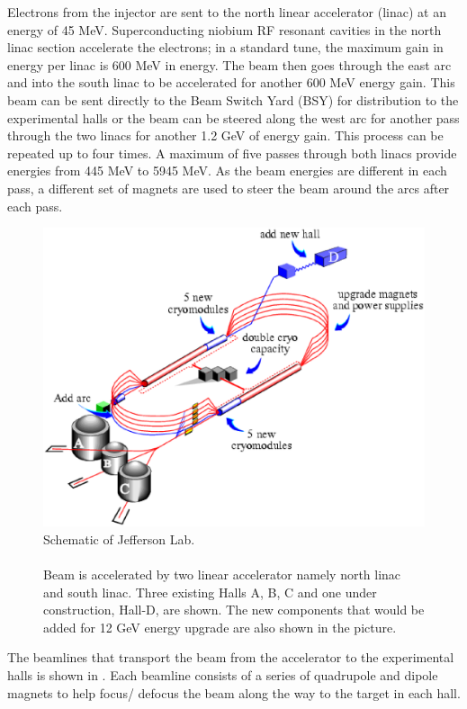 %
\label{LINAC}
Electrons from the injector are sent to the north linear accelerator (linac) at an energy of 45 MeV. Superconducting niobium RF resonant cavities in the north linac section accelerate the electrons; in a standard tune, the maximum gain in energy per linac is 600 MeV in energy. The beam then goes through the east arc and into the south linac to be accelerated for another 600 MeV energy gain. This beam can be sent directly to the Beam Switch Yard (BSY) for distribution to the experimental halls or the beam can be steered along the west arc for another pass through the two linacs for another 1.2 GeV of energy gain. This process can be repeated up to four times. A maximum of five passes  through both linacs provide energies from 445 MeV to 5945 MeV. As the beam energies are different in each pass, a different set of magnets are used to steer the beam around the arcs after each pass.

\begin{figure}[!tbp]
  \centering
  \includegraphics[trim = 0mm 57mm 0mm 50mm,clip,width=1.0\columnwidth]{beamline}
  \caption[Schematic of Jefferson Lab.]{\label{fig:beamline}Schematic of Jefferson Lab.\\\\ Beam is accelerated by two linear accelerator namely north linac and south linac. Three existing Halls A, B, C and one under construction, Hall-D, are shown. The new components that would be added for 12 GeV energy upgrade are also shown in the picture.}
\end{figure}
%
\label{Beamline}
The beamlines that transport the beam from the accelerator to the experimental halls  is shown in . Each beamline consists of a series of quadrupole and dipole magnets to help focus/ defocus the beam along the way to the target in each hall.

